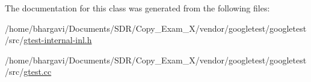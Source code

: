 The documentation for this class was generated from the following files\+:\begin{DoxyCompactItemize}
\item 
/home/bhargavi/\+Documents/\+S\+D\+R/\+Copy\+\_\+\+Exam\+\_\+X/vendor/googletest/googletest/src/\hyperlink{gtest-internal-inl_8h}{gtest-\/internal-\/inl.\+h}\item 
/home/bhargavi/\+Documents/\+S\+D\+R/\+Copy\+\_\+\+Exam\+\_\+X/vendor/googletest/googletest/src/\hyperlink{gtest_8cc}{gtest.\+cc}\end{DoxyCompactItemize}
